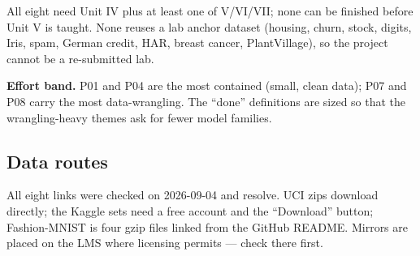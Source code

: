 \documentclass[11pt]{article}
\begin{document}
All eight need Unit IV plus at least one of V/VI/VII; none can be finished before Unit V is taught. None reuses a lab anchor dataset (housing, churn, stock, digits, Iris, spam, German credit, HAR, breast cancer, PlantVillage), so the project cannot be a re-submitted lab.

\textbf{Effort band.} P01 and P04 are the most contained (small, clean data); P07 and P08 carry the most data-wrangling. The ``done'' definitions are sized so that the wrangling-heavy themes ask for fewer model families.

\hypertarget{data-routes}{%
\subsection{Data routes}\label{data-routes}}

All eight links were checked on 2026-09-04 and resolve. UCI zips download directly; the Kaggle sets need a free account and the ``Download'' button; Fashion-MNIST is four gzip files linked from the GitHub README. Mirrors are placed on the LMS where licensing permits --- check there first.
\end{document}
